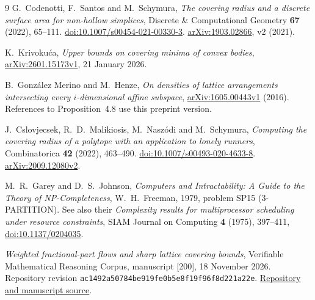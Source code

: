 \documentclass[11pt,a4paper]{article}
\theoremstyle{remark}\newtheorem{remark}[theorem]{Remark}
\begin{document}
\begin{thebibliography}{9}
G.~Codenotti, F.~Santos and M.~Schymura,
\emph{The covering radius and a discrete surface area for non-hollow
simplices}, Discrete \& Computational Geometry \textbf{67} (2022),
65--111. \href{https://doi.org/10.1007/s00454-021-00330-3}
{doi:10.1007/s00454-021-00330-3}.
\href{https://arxiv.org/abs/1903.02866}{arXiv:1903.02866}, v2 (2021).

K.~Krivoku\'ca, \emph{Upper bounds on covering minima of convex bodies},
\href{https://arxiv.org/abs/2601.15173}{arXiv:2601.15173v1},
21 January 2026.

B.~Gonz\'alez Merino and M.~Henze,
\emph{On densities of lattice arrangements intersecting every
$i$-dimensional affine subspace},
\href{https://arxiv.org/abs/1605.00443}{arXiv:1605.00443v1} (2016).
References to Proposition~4.8 use this preprint version.

J.~Cslovjecsek, R.~D.~Malikiosis, M.~Nasz\'odi and M.~Schymura,
\emph{Computing the covering radius of a polytope with an application
to lonely runners}, Combinatorica \textbf{42} (2022), 463--490.
\href{https://doi.org/10.1007/s00493-020-4633-8}
{doi:10.1007/s00493-020-4633-8}.
\href{https://arxiv.org/abs/2009.12080}{arXiv:2009.12080v2}.

M.~R.~Garey and D.~S.~Johnson,
\emph{Computers and Intractability: A Guide to the Theory of
NP-Completeness}, W.~H.~Freeman, 1979, problem SP15 (3-PARTITION).
See also their \emph{Complexity results for multiprocessor scheduling
under resource constraints}, SIAM Journal on Computing
\textbf{4} (1975), 397--411,
\href{https://doi.org/10.1137/0204035}{doi:10.1137/0204035}.

\emph{Weighted fractional-part flows and sharp lattice covering bounds},
Verifiable Mathematical Reasoning Corpus, manuscript [200],
18 November 2026. Repository revision
\texttt{ac1492a50784be919fe0b5e8f19f96f8d221a22e}.
\href{https://github.com/QEEDDD/Verifiable-Mathematical-Reasoning-Corpus}
{Repository and manuscript source}.
\end{thebibliography}
\end{document}
